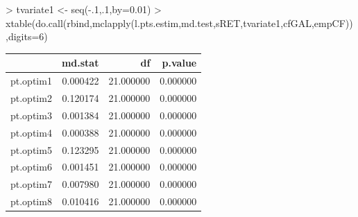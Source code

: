 \documentclass{report}
\begin{document}
\begin{Schunk}
\begin{Sinput}
> 	tvariate1 <- seq(-.1,.1,by=0.01)
> 	xtable(do.call(rbind,mclapply(l.pts.estim,md.test,sRET,tvariate1,cfGAL,empCF)),digits=6)
\end{Sinput}
\begin{table}[ht]
\centering
\begin{tabular}{rrrr}
  \hline
 & md.stat & df & p.value \\ 
  \hline
pt.optim1 & 0.000422 & 21.000000 & 0.000000 \\ 
  pt.optim2 & 0.120174 & 21.000000 & 0.000000 \\ 
  pt.optim3 & 0.001384 & 21.000000 & 0.000000 \\ 
  pt.optim4 & 0.000388 & 21.000000 & 0.000000 \\ 
  pt.optim5 & 0.123295 & 21.000000 & 0.000000 \\ 
  pt.optim6 & 0.001451 & 21.000000 & 0.000000 \\ 
  pt.optim7 & 0.007980 & 21.000000 & 0.000000 \\ 
  pt.optim8 & 0.010416 & 21.000000 & 0.000000 \\ 
   \hline
\end{tabular}
\end{table}\end{Schunk}
\end{document}
